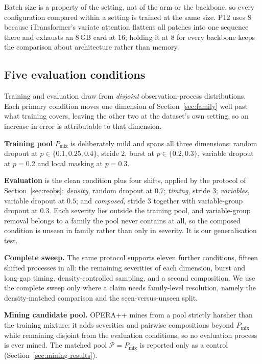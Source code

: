 Batch size is a property of the setting, not of the arm or the backbone, so every configuration compared within a
setting is trained at the same size. P12 uses $8$ because iTransformer's variate attention flattens all patches
into one sequence there and exhausts an 8\,GB card at $16$; holding it at $8$ for every backbone keeps the
comparison about architecture rather than memory.

\subsection{Five evaluation conditions}
\label{sec:splits}
Training and evaluation draw from \emph{disjoint} observation-process distributions. Each primary condition moves
one dimension of Section~\ref{sec:family} well past what training covers, leaving the other two at the dataset's
own setting, so an increase in error is attributable to that dimension.

\textbf{Training pool} $P_{\mathrm{mix}}$ is deliberately mild and spans all three dimensions: random dropout at
$p\in\{0.1,0.25,0.4\}$, stride $2$, burst at $p\in\{0.2,0.3\}$, variable dropout at $p=0.2$ and local masking at
$p=0.3$.

\textbf{Evaluation} is the clean condition plus four shifts, applied by the protocol of Section~\ref{sec:reobs}:
\emph{density}, random dropout at $0.7$; \emph{timing}, stride $3$; \emph{variables}, variable dropout at $0.5$;
and \emph{composed}, stride $3$ together with variable-group dropout at $0.3$. Each severity lies outside the
training pool, and variable-group removal belongs to a family the pool never contains at all, so the composed
condition is unseen in family rather than only in severity. It is our generalisation test.

\textbf{Complete sweep.} The same protocol supports eleven further conditions, fifteen shifted processes in all:
the remaining severities of each dimension, burst and long-gap timing, density-controlled sampling, and a second
composition. We use the complete sweep only where a claim needs family-level resolution, namely the
density-matched comparison and the seen-versus-unseen split.

\textbf{Mining candidate pool.} OPERA++ mines from a pool strictly harsher than the training mixture: it adds
severities and pairwise compositions beyond $P_{\mathrm{mix}}$ while remaining disjoint from the evaluation
conditions, so no evaluation process is ever mined. The matched pool $\mathcal{P}=P_{\mathrm{mix}}$ is reported
only as a control (Section~\ref{sec:mining-results}).

